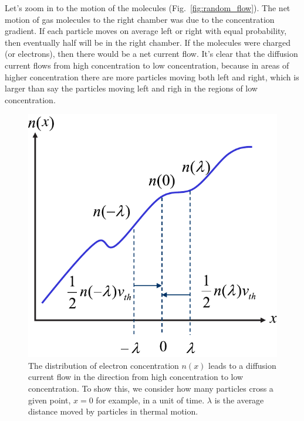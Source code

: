 Let’s zoom in to the motion of the molecules (Fig.~\ref{fig:random_flow}).  The net motion of gas molecules to the right chamber was due to the concentration gradient.
If each particle moves on average left or right with equal probability, then eventually half will be in the right chamber. If the molecules were charged (or electrons), then there would be a net current flow.  It's clear that the diffusion current flows from high concentration to low concentration, because in areas of higher concentration there are more particles moving both left and right, which is larger than say the particles moving left and righ in the regions of low concentration.
\begin{figure}[tb]
\centering
\includegraphics[width=.45\columnwidth]{slide48}
\caption{The distribution of electron concentration $n(x)$ leads to a diffusion current flow in the direction from high concentration to low concentration.  To show this, we consider how many particles cross a given point, $x=0$ for example, in a unit of time.  $\lambda$ is the average distance moved by particles in thermal motion.}
\label{fig:slide48}
\end{figure}
